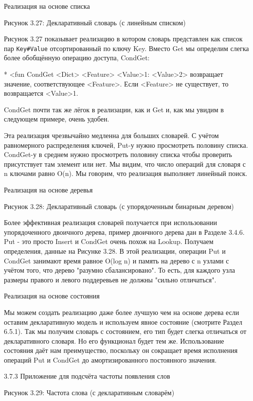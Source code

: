 Реализация на основе списка

Рисунок 3.27: Декларативный словарь (с линейным списком)

Рисунок 3.27 показывает реализацию в котором словарь представлен как список пар \verb!Key#Value! отсортированный по ключу Key. Вместо Get мы определим слегка более обобщённую операцию доступа, CondGet:

* <fun {CondGet <Dict> <Feature> <Value>1}: <Value>2> возвращает значение, соответствующее <Feature>. Если <Feature> не существует, то возвращается <Value>1.

CondGet почти так же лёгок в реализации, как и Get и, как мы увидим в следующем примере, очень удобен.

Эта реализация чрезвычайно медленна для больших словарей. С учётом равномерного распределения ключей, Put-у нужно просмотреть половину списка. CondGet-у в среднем нужно просмотреть половину списка чтобы проверить присутствует там элемент или нет. Мы видим, что число операций для словаря с n ключами равно O(n). Мы говорим, что реализация выполняет линейный поиск.

Реализация на основе деревья

Рисунок 3.28: Декларативный словарь (с упорядоченным бинарным деревом)

Более эффективная реализация словарей получается при использовании упорядоченного двоичного дерева, пример двоичного дерева дан в Разделе 3.4.6. Put - это просто Insert и CondGet очень похож на Lookup. Получаем определения, данные на Рисунке 3.28. В этой реализации, операции Put и CondGet занимают время равное O(log n) и память на дерево с n узлами с учётом того, что дерево "разумно сбалансировано". То есть, для каждого узла размеры правого и левого поддеревьев не должны "сильно отличаться".

Реализация на основе состояния

Мы можем создать реализацию даже более лучшую чем на основе дерева если оставим декларативную модель и используем явное состояние (смотрите Раздел 6.5.1). Так мы получим словарь с состоянием, его тип будет слегка отличаться от декларативного словаря. Но его функционал будет тем же. Использование состояния даёт нам преимущество, поскольку он сокращает время исполнения операций Put и CondGet до амортизированного постоянного значения.

3.7.3 Приложение для подсчёта частоты появления слов

Рисунок 3.29: Частота слова (с декларативным словарём)

